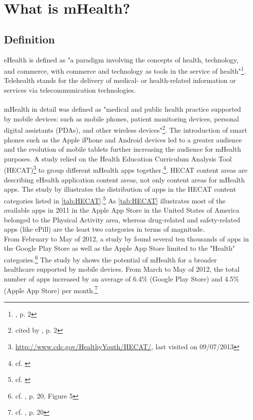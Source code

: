 \section{What is mHealth?}
\subsection{Definition}
eHealth is defined as "a paradigm involving the concepts of health, technology, and commerce, with commerce and technology as tools in the service of health"\footnote{\cite{MartinezPerez.2013}, p. 2}.
\\
Telehealth stands for the delivery of medical- or health-related information or services via telecommunication technologies.
\\
\\
mHealth in detail was defined as "medical and public health practice supported by mobile devices: such as mobile phones, patient monitoring devices, personal digital assistants (PDAs), and other wireless devices"\footnote{\cite{WorldHealthOrganization.2011} cited by \cite{MartinezPerez.2013}, p. 2}. The introduction of smart phones such as the Apple iPhone and Android devices led to a greater audience and the evolution of mobile tablets further increasing the audience for mHealth purposes. A study relied on the Health Education Curriculum Analysis Tool (HECAT)\footnote{\url{http://www.cdc.gov/HealthyYouth/HECAT/}, last visited on 09/07/2013} to group different mHealth apps together.\footnote{cf. \cite{West.2012}}. HECAT content areas are describing eHealth application content areas, not only content areas for mHealth apps. The study by \cite{West.2012} illustrates the distribution of apps in the HECAT content categories listed in \ref{tab:HECAT}.\footnote{cf. \cite{West.2012}} As \ref{tab:HECAT} illustrates most of the available apps in 2011 in the Apple App Store in the United States of America belonged to the Physical Activity area, whereas drug-related and safety-related apps (like ePill) are the least two categories in terms of magnitude.
\\
From February to May of 2012, a study by \cite{dHeureuse.2012} found several ten thousands of apps in the Google Play Store as well as the Apple App Store limited to the "Health" categories.\footnote{cf. \cite{dHeureuse.2012}, p. 20, Figure 5} The study by \cite{dHeureuse.2012} shows the potential of mHealth for a broader healthcare supported by mobile devices. From March to May of 2012, the total number of apps increased by an average of 6.4\% (Google Play Store) and 4.5\% (Apple App Store) per month.\footnote{cf. \cite{dHeureuse.2012}, p. 20}

